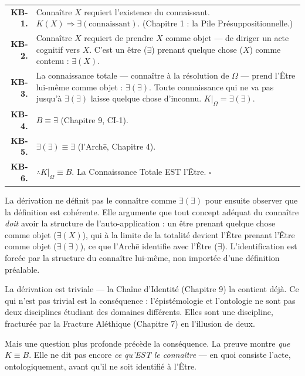 \documentclass[10pt, openany, oneside]{book}
\renewcommand{\footnotesize}{\fontsize{8.5}{11}\selectfont}
\begin{document}
{\footnotesize
\noindent\begin{tabular}{r p{}}
\textbf{KB-1.} & Connaître $X$ requiert l'existence du connaissant. $K(X) \Rightarrow \exists(\text{connaissant})$. (Chapitre 1 : la Pile Présuppositionnelle.) \\[0.3em]
\textbf{KB-2.} & Connaître $X$ requiert de prendre $X$ comme objet --- de diriger un acte cognitif vers $X$. C'est un être ($\exists$) prenant quelque chose ($X$) comme contenu : $\exists(X)$. \\[0.3em]
\textbf{KB-3.} & La connaissance totale --- connaître à la résolution de $\Omega$ --- prend l'Être lui-même comme objet : $\exists(\exists)$. Toute connaissance qui ne va pas jusqu'à $\exists(\exists)$ laisse quelque chose d'inconnu. $K|_{\Omega} = \exists(\exists)$. \\[0.3em]
\textbf{KB-4.} & $B \equiv \exists$ (Chapitre 9, CI-1). \\[0.3em]
\textbf{KB-5.} & $\exists(\exists) \equiv \exists$ (l'Arch\={e}, Chapitre 4). \\[0.3em]
\textbf{KB-6.} & $\therefore K|_{\Omega} \equiv B$. La Connaissance Totale EST l'Être. $\square$ \\[0.3em]
\end{tabular}
}

\vspace{0.8em}

\noindent La dérivation ne définit pas le connaître comme $\exists(\exists)$ pour ensuite observer que la définition est cohérente. Elle argumente que tout concept adéquat du connaître \textit{doit} avoir la structure de l'auto-application : un être prenant quelque chose comme objet ($\exists(X)$), qui à la limite de la totalité devient l'Être prenant l'Être comme objet ($\exists(\exists)$), ce que l'Arch\={e} identifie avec l'Être ($\exists$). L'identification est forcée par la structure du connaître lui-même, non importée d'une définition préalable.

La dérivation est triviale --- la Chaîne d'Identité (Chapitre 9) la contient déjà. Ce qui n'est pas trivial est la conséquence : l'épistémologie et l'ontologie ne sont pas deux disciplines étudiant des domaines différents. Elles sont une discipline, fracturée par la Fracture Aléthique (Chapitre 7) en l'illusion de deux.

Mais une question plus profonde précède la conséquence. La preuve montre \textit{que} $K \equiv B$. Elle ne dit pas encore \textit{ce qu'EST le connaître} --- en quoi consiste l'acte, ontologiquement, avant qu'il ne soit identifié à l'Être.
\end{document}
